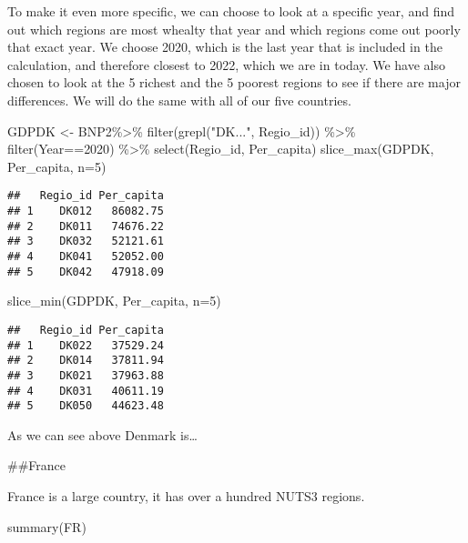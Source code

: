 \documentclass[
]{article}
\newenvironment{Shaded}{\begin{snugshade}}{\end{snugshade}}
\newcommand{\AttributeTok}[1]{\textcolor[rgb]{0.77,0.63,0.00}{#1}}
\newcommand{\DecValTok}[1]{\textcolor[rgb]{0.00,0.00,0.81}{#1}}
\newcommand{\FunctionTok}[1]{\textcolor[rgb]{0.00,0.00,0.00}{#1}}
\newcommand{\NormalTok}[1]{#1}
\newcommand{\OtherTok}[1]{\textcolor[rgb]{0.56,0.35,0.01}{#1}}
\newcommand{\SpecialCharTok}[1]{\textcolor[rgb]{0.00,0.00,0.00}{#1}}
\newcommand{\StringTok}[1]{\textcolor[rgb]{0.31,0.60,0.02}{#1}}
\begin{document}
To make it even more specific, we can choose to look at a specific year,
and find out which regions are most whealty that year and which regions
come out poorly that exact year. We choose 2020, which is the last year
that is included in the calculation, and therefore closest to 2022,
which we are in today. We have also chosen to look at the 5 richest and
the 5 poorest regions to see if there are major differences. We will do
the same with all of our five countries.

\begin{Shaded}
\begin{Highlighting}[]
\NormalTok{GDPDK }\OtherTok{\textless{}{-}}\NormalTok{ BNP2}\SpecialCharTok{\%\textgreater{}\%}
  \FunctionTok{filter}\NormalTok{(}\FunctionTok{grepl}\NormalTok{(}\StringTok{"DK..."}\NormalTok{, Regio\_id)) }\SpecialCharTok{\%\textgreater{}\%}
  \FunctionTok{filter}\NormalTok{(Year}\SpecialCharTok{==}\DecValTok{2020}\NormalTok{) }\SpecialCharTok{\%\textgreater{}\%}
  \FunctionTok{select}\NormalTok{(Regio\_id, Per\_capita)}
\FunctionTok{slice\_max}\NormalTok{(GDPDK, Per\_capita, }\AttributeTok{n=}\DecValTok{5}\NormalTok{)}
\end{Highlighting}
\end{Shaded}

\begin{verbatim}
##   Regio_id Per_capita
## 1    DK012   86082.75
## 2    DK011   74676.22
## 3    DK032   52121.61
## 4    DK041   52052.00
## 5    DK042   47918.09
\end{verbatim}

\begin{Shaded}
\begin{Highlighting}[]
\FunctionTok{slice\_min}\NormalTok{(GDPDK, Per\_capita, }\AttributeTok{n=}\DecValTok{5}\NormalTok{)}
\end{Highlighting}
\end{Shaded}

\begin{verbatim}
##   Regio_id Per_capita
## 1    DK022   37529.24
## 2    DK014   37811.94
## 3    DK021   37963.88
## 4    DK031   40611.19
## 5    DK050   44623.48
\end{verbatim}

As we can see above Denmark is\ldots{}

\#\#France

France is a large country, it has over a hundred NUTS3 regions.

\begin{Shaded}
\begin{Highlighting}[]
\FunctionTok{summary}\NormalTok{(FR)}
\end{Highlighting}
\end{Shaded}
\end{document}
